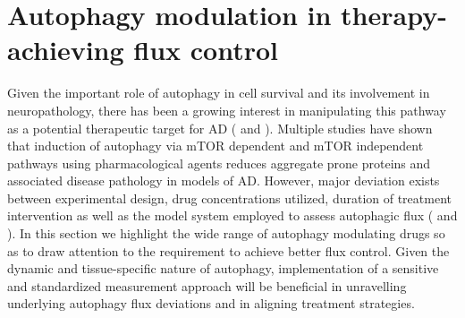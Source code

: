 \section{Autophagy modulation in therapy-achieving flux control}
Given the important role of autophagy in cell survival and its involvement in neuropathology, there has been a growing interest in manipulating this pathway as a potential therapeutic target for AD ( and ). Multiple studies have shown that induction of autophagy via mTOR dependent and mTOR independent pathways using pharmacological agents reduces aggregate prone proteins and associated disease pathology in models of AD. However, major deviation exists between experimental design, drug concentrations utilized, duration of treatment intervention as well as the model system employed to assess autophagic flux ( and ). In this section we highlight the wide range of autophagy modulating drugs so as to draw attention to the requirement to achieve better flux control. Given the dynamic and tissue-specific nature of autophagy, implementation of a sensitive and standardized measurement approach will be beneficial in unravelling underlying autophagy flux deviations and in aligning treatment strategies.





